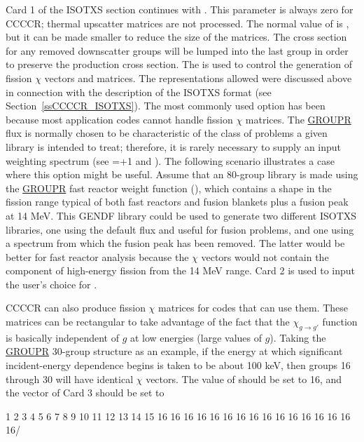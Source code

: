 Card 1 of the ISOTXS section continues with .  This
parameter is always zero for CCCCR; thermal upscatter matrices are
not processed.  The normal value of  is ,
but it can be made smaller to reduce the size of the matrices.
The cross section for any removed downscatter groups will be
lumped into the last group in order to preserve the production
cross section. The  is used to control the generation
of fission $\chi$ vectors and matrices.  The representations allowed
were discussed above in connection with the description of the
ISOTXS format (see Section~\ref{ssCCCCR_ISOTXS}).  The most commonly used
option has been  because most application codes cannot
handle fission $\chi$ matrices.  The
\hyperlink{sGROUPRhy}{GROUPR} flux is normally
chosen to be characteristic of the class of problems a given
library is intended to treat; therefore, it is rarely necessary
to supply an input weighting spectrum (see =+1 and
).  The following scenario illustrates a case where
this option might be useful.  Assume that an 80-group library
is made using the \hyperlink{sGROUPRhy}{GROUPR}
fast reactor weight function
(), which contains a shape in the fission range
typical of both fast reactors and fusion blankets plus a fusion
peak at 14 MeV.  This GENDF library could be used to generate
two different ISOTXS libraries, one using the default flux and
useful for fusion problems, and one using a spectrum 
from which the fusion peak has been removed.  The latter would
be better for fast reactor analysis because the $\chi$ vectors
would not contain the component of high-energy fission from the
14 MeV range.  Card 2 is used to input the user's choice for
.

CCCCR can also produce fission $\chi$ matrices for codes that can
use them.  These matrices can be rectangular to take advantage of
the fact that the $\chi_{g\rightarrow g'}$ function is basically
independent of $g$ at low energies (large values of $g$).  Taking
the \hyperlink{sGROUPRhy}{GROUPR} 30-group structure as an
example, if the energy at
which significant incident-energy dependence begins is taken to
be about 100 keV, then groups 16 through 30 will have identical
$\chi$ vectors.  The value of  should be set to 16,
and the  vector of Card 3 should be set to

\small
\begin{ccode}

  1 2 3 4 5 6 7 8 9 10 11 12 13 14 15
  16 16 16 16 16 16 16 16 16 16 16 16 16 16 16 16/

\end{ccode}
\normalsize


